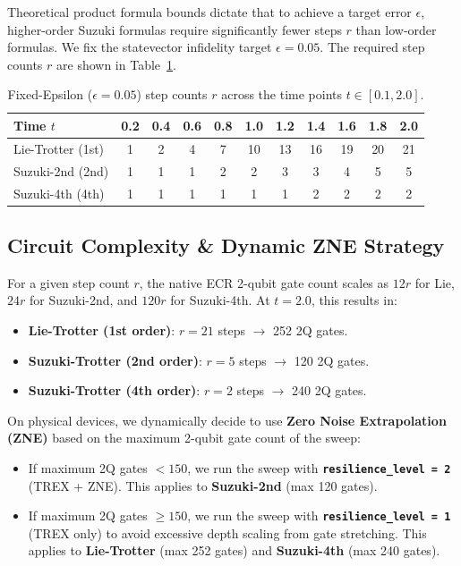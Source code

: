 \documentclass[11pt,a4paper]{article}
\begin{document}
Theoretical product formula bounds dictate that to achieve a target error $\epsilon$, higher-order Suzuki formulas require significantly fewer steps $r$ than low-order formulas. We fix the statevector infidelity target $\epsilon = 0.05$. The required step counts $r$ are shown in Table~\ref{tab:step_mapping}.


\begin{table}[H]
\centering
\caption{Fixed-Epsilon ($\epsilon = 0.05$) step counts $r$ across the time points $t \in [0.1, 2.0]$.}
\label{tab:step_mapping}
\begin{tabular}{lcccccccccc}
\toprule
Time $t$ & 0.2 & 0.4 & 0.6 & 0.8 & 1.0 & 1.2 & 1.4 & 1.6 & 1.8 & 2.0 \\
\midrule
Lie-Trotter (1st) & 1 & 2 & 4 & 7 & 10 & 13 & 16 & 19 & 20 & 21 \\
Suzuki-2nd (2nd) & 1 & 1 & 1 & 2 & 2 & 3 & 3 & 4 & 5 & 5 \\
Suzuki-4th (4th) & 1 & 1 & 1 & 1 & 1 & 1 & 2 & 2 & 2 & 2 \\
\bottomrule
\end{tabular}
\end{table}


\subsection{Circuit Complexity \& Dynamic ZNE Strategy}

For a given step count $r$, the native ECR 2-qubit gate count scales as $12r$ for Lie, $24r$ for Suzuki-2nd, and $120r$ for Suzuki-4th. 
At $t=2.0$, this results in:
\begin{itemize}
    \item \textbf{Lie-Trotter (1st order)}: $r=21$ steps $\rightarrow$ 252 2Q gates.
    \item \textbf{Suzuki-Trotter (2nd order)}: $r=5$ steps $\rightarrow$ 120 2Q gates.
    \item \textbf{Suzuki-Trotter (4th order)}: $r=2$ steps $\rightarrow$ 240 2Q gates.
\end{itemize}

On physical devices, we dynamically decide to use \textbf{Zero Noise Extrapolation (ZNE)} based on the maximum 2-qubit gate count of the sweep:
\begin{itemize}
    \item If maximum 2Q gates $< 150$, we run the sweep with \textbf{\texttt{resilience\_level = 2}} (TREX + ZNE). This applies to \textbf{Suzuki-2nd} (max 120 gates).
    \item If maximum 2Q gates $\ge 150$, we run the sweep with \textbf{\texttt{resilience\_level = 1}} (TREX only) to avoid excessive depth scaling from gate stretching. This applies to \textbf{Lie-Trotter} (max 252 gates) and \textbf{Suzuki-4th} (max 240 gates).
\end{itemize}
\end{document}
